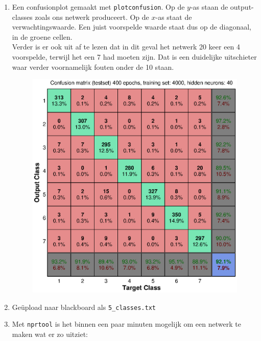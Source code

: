 \documentclass[a4paper,10pt,fleqn]{article}
\begin{document}
\begin{enumerate}[1.]
	\item Een confusionplot gemaakt met \verb|plotconfusion|. Op de $y$-as staan de output-classes zoals ons netwerk produceert. Op de $x$-as staat de verwachtingswaarde. Een juist voorspelde waarde staat dus op de diagonaal, in de groene cellen.  \\
    Verder is er ook uit af te lezen dat in dit geval het netwerk 20 keer een 4 voorspelde, terwijl het een 7 had moeten zijn. Dat is een duidelijke uitschieter waar verder voornamelijk fouten onder de 10 staan.

	\begin{figure}[!ht]
    	\centering
        \includegraphics[width=.8\textwidth]{images/confusion-matrix-eps}
    \end{figure}

	\item Geüpload naar blackboard als \verb|5_classes.txt|

	\item Met \verb|nprtool| is het binnen een paar minuten mogelijk om een netwerk te maken wat er zo uitziet:


\end{enumerate}
\end{document}
